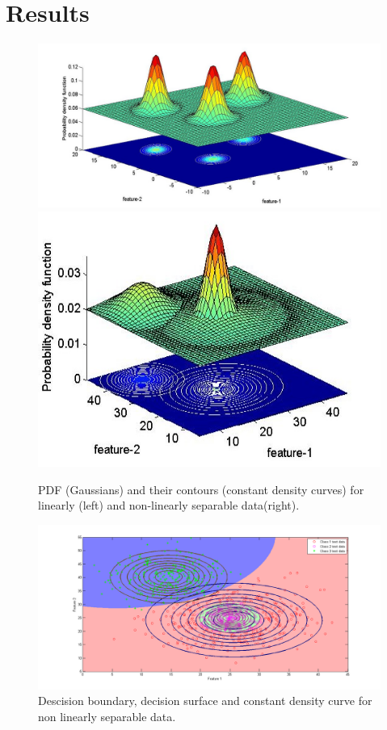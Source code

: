 \documentclass[10pt]{report}
\begin{document}
\section{Results}
\begin{figure}[!htb]
  \includegraphics[width=\linewidth]{ls_pdf_con.jpg}
\endminipage\hfill
{}
  \includegraphics[width=\linewidth]{nls_pdf_con.jpg}
\endminipage\hfill
\caption{PDF (Gaussians) and their contours (constant density curves) for linearly (left) and non-linearly separable data(right).}
\end{figure}

\begin{figure}
\includegraphics[width=\linewidth]{des_con_.png}
\caption{Descision boundary, decision surface and constant density curve for non linearly separable data.}
\end{figure}
\end{document}

